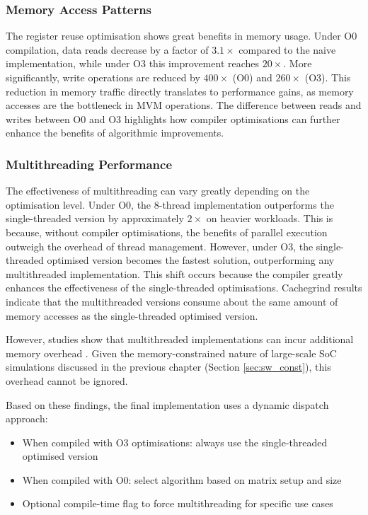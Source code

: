 \subsubsection{Memory Access Patterns}\label{sec:mem_access}
The register reuse optimisation shows great benefits in memory usage.
Under O0 compilation, data reads decrease by a factor of $3.1\times$ compared to the naive implementation, while under O3 this improvement reaches $20\times$.
More significantly, write operations are reduced by $400\times$ (O0) and $260\times$ (O3).
This reduction in memory traffic directly translates to performance gains, as memory accesses are the bottleneck in MVM operations.
The difference between reads and writes between O0 and O3 highlights how compiler optimisations can further enhance the benefits of algorithmic improvements.

\subsubsection{Multithreading Performance}\label{sec:multi_perf}
The effectiveness of multithreading can vary greatly depending on the optimisation level.
Under O0, the 8-thread implementation outperforms the single-threaded version by approximately $2\times$ on heavier workloads.
This is because, without compiler optimisations, the benefits of parallel execution outweigh the overhead of thread management.
However, under O3, the single-threaded optimised version becomes the fastest solution, outperforming any multithreaded implementation.
This shift occurs because the compiler greatly enhances the effectiveness of the single-threaded optimisations.
Cachegrind results indicate that the multithreaded versions consume about the same amount of memory accesses as the single-threaded optimised version.

However, studies show that multithreaded implementations can incur additional memory overhead \cite{tang_multithreaded_2024}.
Given the memory-constrained nature of large-scale SoC simulations discussed in the previous chapter (Section \ref{sec:sw_const}), this overhead cannot be ignored.

Based on these findings, the final implementation uses a dynamic dispatch approach:
\begin{itemize}
    \item When compiled with O3 optimisations: always use the single-threaded optimised version
    \item When compiled with O0: select algorithm based on matrix setup and size
    \item Optional compile-time flag to force multithreading for specific use cases
\end{itemize}

